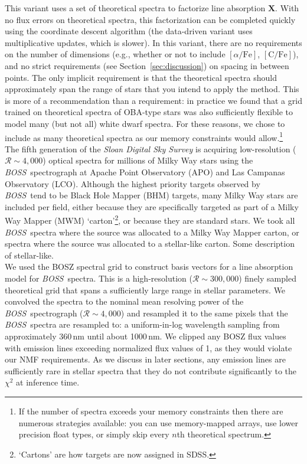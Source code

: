 \documentclass[modern]{aastex631}
\newcommand{\project}[1]{\textit{#1}}
\newcommand{\vecX}{\mathbf{X}}
\newcommand{\boss}{\project{BOSS}}
\newcommand{\todo}[1]{\textcolor{tab:blue}{#1}}
\begin{document}
This variant uses a set of theoretical spectra to factorize line absorption $\vecX$. With no flux errors on theoretical spectra, this factorization can be completed quickly using the coordinate descent algorithm (the data-driven variant uses multiplicative updates, which is slower). In this variant, there are no requirements on the number of dimensions (e.g., whether or not to include $[\alpha/\mathrm{Fe}]$, $[\mathrm{C/Fe}]$), and no strict requirements (see Section~\ref{sec:discussion}) on spacing in between points. The only implicit requirement is that the theoretical spectra should approximately span the range of stars that you intend to apply the method. This is more of a recommendation than a requirement: in practice we found that a grid trained on theoretical spectra of OBA-type stars was also sufficiently flexible to model many (but not all) white dwarf spectra. For these reasons, we chose to include as many theoretical spectra as our memory constraints would allow.\footnote{If the number of spectra exceeds your memory constraints then there are numerous strategies available: you can use memory-mapped arrays, use lower precision float types, or simply skip every $n$th theoretical spectrum.}\\

The fifth generation of the \emph{Sloan Digital Sky Survey}  is acquiring low-resolution ($\mathcal{R} \sim 4{,}000$) optical spectra for millions of Milky Way stars using the \boss\ spectrograph at Apache Point Observatory (APO) and Las Campanas Observatory (LCO). Although the highest priority targets observed by \boss\ tend to be Black Hole Mapper (BHM) targets, many Milky Way stars are included per field, either because they are specifically targeted as part of a Milky Way Mapper (MWM) `carton'\footnote{`Cartons' are how targets are now assigned in SDSS.}, or because they are standard stars. We took all \boss\ spectra where the source was allocated to a Milky Way Mapper carton, or spectra where the source was allocated to a stellar-like carton. \todo{Some description of stellar-like.}\\

We used the BOSZ spectral grid to construct basis vectors for a line absorption model for \boss\ spectra. This is a high-resolution ($\mathcal{R} \sim 300{,}000$) finely sampled theoretical grid that spans a sufficiently large range in stellar parameters. We convolved the spectra to the nominal mean resolving power of the \boss\ spectrograph ($\mathcal{R} \sim 4{,}000$) and resampled it to the same pixels that the \boss\ spectra are resampled to: a uniform-in-log wavelength sampling from approximately 360\,nm until about 1000\,nm. We clipped any BOSZ flux values with emission lines exceeding normalized flux values of 1, as they would violate our NMF requirements. As we discuss in later sections, any emission lines are sufficiently rare in stellar spectra that they do not contribute significantly to the $\chi^2$ at inference time.\\
\end{document}
